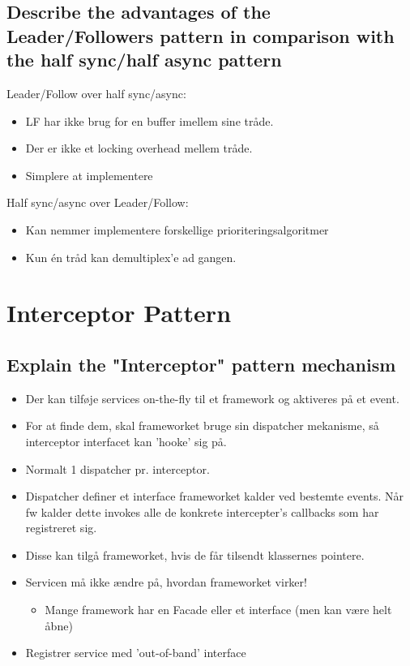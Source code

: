 \documentclass{article}
\begin{document}
\subsection{Describe the advantages of the Leader/Followers pattern in comparison with the half sync/half async pattern}

Leader/Follow over half sync/async:
\vspace{-10pt}
\begin{itemize}
	\item LF har ikke brug for en buffer imellem sine tråde.
	\item Der er ikke et locking overhead mellem tråde.
	\item Simplere at implementere
\end{itemize}

Half sync/async over Leader/Follow:
\vspace{-10pt}
\begin{itemize}
	\item Kan nemmer implementere forskellige prioriteringsalgoritmer
	\item Kun én tråd kan demultiplex'e ad gangen.
\end{itemize}





\newpage
\section{Interceptor Pattern}

\subsection{Explain the "Interceptor" pattern mechanism}
\begin{itemize}
	\item Der kan tilføje services on-the-fly til et framework og aktiveres på et event.
	\item For at finde dem, skal frameworket bruge sin dispatcher mekanisme, så interceptor interfacet kan 'hooke' sig på.
	\item Normalt 1 dispatcher pr. interceptor.
	\item Dispatcher definer et interface frameworket kalder ved bestemte events. 
	Når fw kalder dette invokes alle de konkrete intercepter's callbacks som har registreret sig.
	\item Disse kan tilgå frameworket, hvis de får tilsendt klassernes pointere.
	\item Servicen må ikke ændre på, hvordan frameworket virker!
	\begin{itemize}
		\item Mange framework har en Facade eller et interface (men kan være helt åbne)
	\end{itemize}
	\item Registrer service med 'out-of-band' interface
\end{itemize}
\end{document}
